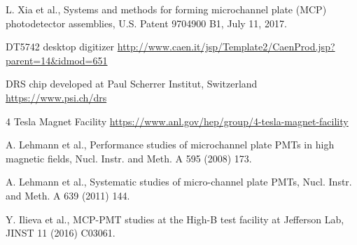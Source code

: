 \documentclass[preprint,5p]{elsarticle}
\begin{document}
\begin{thebibliography}{00}
L. Xia et al., Systems and methods for forming microchannel plate (MCP) 
photodetector assemblies, U.S. Patent 9704900 B1, July 11, 2017.

DT5742 desktop digitizer 
\url{http://www.caen.it/jsp/Template2/CaenProd.jsp?parent=14&idmod=651}

   DRS chip developed at Paul Scherrer Institut, Switzerland \url{
https://www.psi.ch/drs}

4 Tesla Magnet Facility 
\url{https://www.anl.gov/hep/group/4-tesla-magnet-facility}

A. Lehmann et al., Performance studies of microchannel plate PMTs in high 
magnetic fields, Nucl. Instr. and Meth. A 595 (2008) 173.

A. Lehmann et al., Systematic studies of micro-channel plate PMTs, Nucl.  
Instr. and Meth. A 639 (2011) 144.

Y. Ilieva et al., MCP-PMT studies at the High-B test facility at Jefferson Lab, 
JINST 11 (2016) C03061.

\end{thebibliography}
\end{document}
